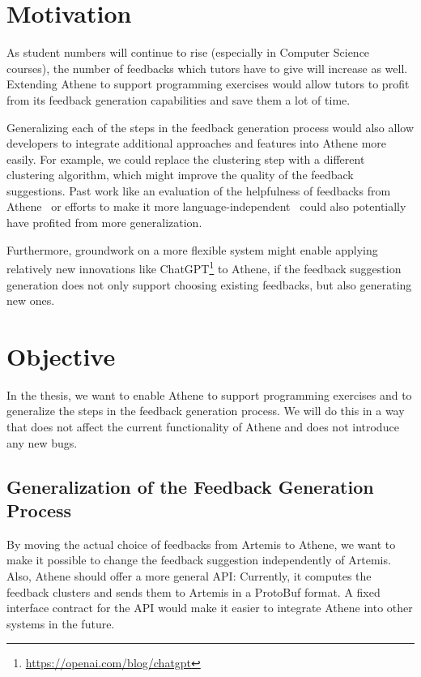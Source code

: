 \section*{Motivation}

As student numbers will continue to rise (especially in Computer Science courses), the number of feedbacks which tutors have to give will increase as well. Extending Athene to support programming exercises would allow tutors to profit from its feedback generation capabilities and save them a lot of time.

Generalizing each of the steps in the feedback generation process would also allow developers to integrate additional approaches and features into Athene more easily.
For example, we could replace the clustering step with a different clustering algorithm, which might improve the quality of the feedback suggestions. Past work like an evaluation of the helpfulness of feedbacks from Athene~\cite{atheneTracking} or efforts to make it more language-independent~\cite{atheneLanguage} could also potentially have profited from more generalization.

Furthermore, groundwork on a more flexible system might enable applying relatively new innovations like ChatGPT\footnote{\url{https://openai.com/blog/chatgpt}} to Athene, if the feedback suggestion generation does not only support choosing existing feedbacks, but also generating new ones.

\section*{Objective}
In the thesis, we want to enable Athene to support programming exercises and to generalize the steps in the feedback generation process. We will do this in a way that does not affect the current functionality of Athene and does not introduce any new bugs.


\subsection*{Generalization of the Feedback Generation Process}
By moving the actual choice of feedbacks from Artemis to Athene, we want to make it possible to change the feedback suggestion independently of Artemis. Also, Athene should offer a more general API: Currently, it computes the feedback clusters and sends them to Artemis in a ProtoBuf format. A fixed interface contract for the API would make it easier to integrate Athene into other systems in the future.

